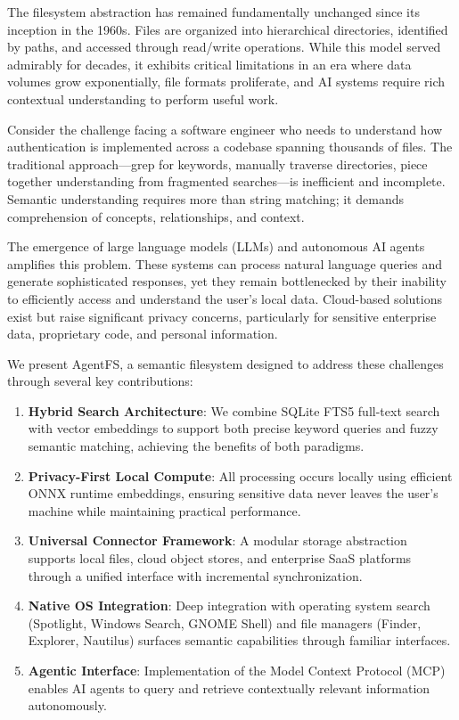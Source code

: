 \documentclass[conference]{IEEEtran}
\begin{document}
The filesystem abstraction has remained fundamentally unchanged since its inception in the 1960s. Files are organized into hierarchical directories, identified by paths, and accessed through read/write operations. While this model served admirably for decades, it exhibits critical limitations in an era where data volumes grow exponentially, file formats proliferate, and AI systems require rich contextual understanding to perform useful work.

Consider the challenge facing a software engineer who needs to understand how authentication is implemented across a codebase spanning thousands of files. The traditional approach---grep for keywords, manually traverse directories, piece together understanding from fragmented searches---is inefficient and incomplete. Semantic understanding requires more than string matching; it demands comprehension of concepts, relationships, and context.

The emergence of large language models (LLMs) and autonomous AI agents amplifies this problem. These systems can process natural language queries and generate sophisticated responses, yet they remain bottlenecked by their inability to efficiently access and understand the user's local data. Cloud-based solutions exist but raise significant privacy concerns, particularly for sensitive enterprise data, proprietary code, and personal information.

We present AgentFS, a semantic filesystem designed to address these challenges through several key contributions:

\begin{enumerate}
    \item \textbf{Hybrid Search Architecture}: We combine SQLite FTS5 full-text search with vector embeddings to support both precise keyword queries and fuzzy semantic matching, achieving the benefits of both paradigms.

    \item \textbf{Privacy-First Local Compute}: All processing occurs locally using efficient ONNX runtime embeddings, ensuring sensitive data never leaves the user's machine while maintaining practical performance.

    \item \textbf{Universal Connector Framework}: A modular storage abstraction supports local files, cloud object stores, and enterprise SaaS platforms through a unified interface with incremental synchronization.

    \item \textbf{Native OS Integration}: Deep integration with operating system search (Spotlight, Windows Search, GNOME Shell) and file managers (Finder, Explorer, Nautilus) surfaces semantic capabilities through familiar interfaces.

    \item \textbf{Agentic Interface}: Implementation of the Model Context Protocol (MCP) enables AI agents to query and retrieve contextually relevant information autonomously.
\end{enumerate}
\end{document}
